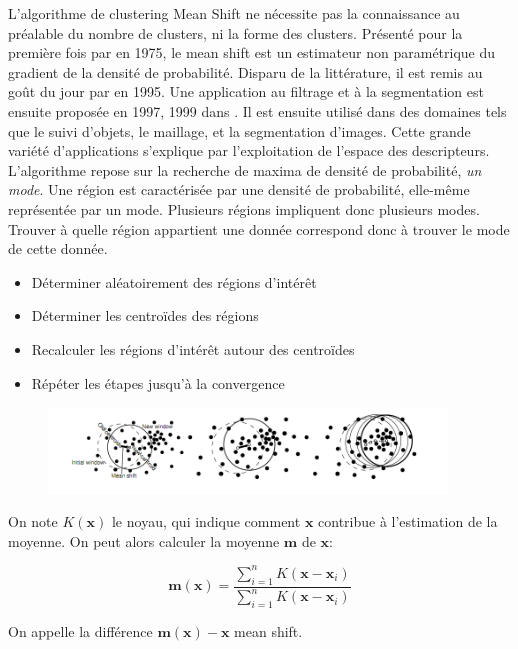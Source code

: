\documentclass{article}
\begin{document}
L'algorithme de clustering Mean Shift ne nécessite pas la connaissance au
préalable du nombre de clusters, ni la forme des clusters. Présenté pour la
première fois par \cite{fukugana} en 1975, le mean shift est un estimateur non
paramétrique du gradient de la densité de probabilité. Disparu de la
littérature, il est remis au goût du jour par \cite{cheng} en 1995. Une
application au filtrage et à la segmentation est ensuite proposée en 1997,
1999 dans \cite{comaniciu_meer}. Il est ensuite utilisé dans des domaines tels
que le suivi d'objets, le maillage, et la segmentation d'images. Cette grande
variété d'applications s'explique par l'exploitation de l'espace des
descripteurs. \\
L'algorithme repose sur la recherche de maxima de densité de probabilité,
\textit{un mode}. Une région est caractérisée par une densité de probabilité,
elle-même représentée par un mode. Plusieurs régions impliquent donc plusieurs
modes. Trouver à quelle région appartient une donnée correspond donc à trouver
le mode de cette donnée.

\begin{itemize}
\item Déterminer aléatoirement des régions d'intérêt
\item Déterminer les centroïdes des régions
\item Recalculer les régions d'intérêt autour des centroïdes
\item Répéter les étapes jusqu'à la convergence
\end{itemize}

\begin{figure}
\includegraphics[width=400px]{images/mean_shift_proc.png}
\end{figure}

On note $K(\mathbf{x})$ le noyau, qui indique comment $\mathbf{x}$ contribue à
l'estimation de la moyenne. On peut alors calculer la moyenne $\mathbf{m}$ de
$\mathbf{x}$:

\begin{equation*}
\mathbf{m}(\mathbf{x}) = \frac{\sum_{i = 1}^n K (\mathbf{x} - \mathbf{x}_i)}{\sum_{i =
1}^n K (\mathbf{x} - \mathbf{x}_i)}
\end{equation*}

On appelle la différence $\mathbf{m}(\mathbf{x}) - \mathbf{x}$ mean shift.
\end{document}
